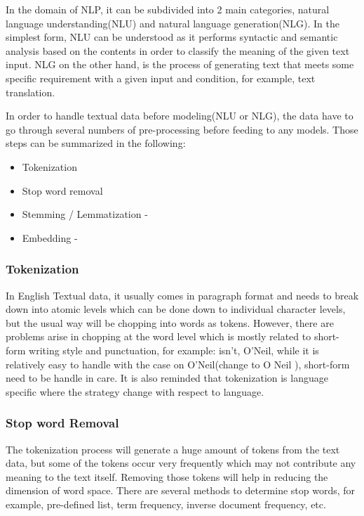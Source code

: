 \documentclass[12pt]{article}
\begin{document}
In the domain of NLP, it can be subdivided into 2 main categories, natural language understanding(NLU) and natural language generation(NLG). In the simplest form, NLU can be understood as it performs syntactic and semantic analysis based on the contents in order to classify the meaning of the given text input. NLG on the other hand, is the process of generating text that meets some specific requirement with a given input and condition, for example, text translation. 
 
In order to handle textual data before modeling(NLU or NLG), the data have to go through several numbers of pre-processing  before feeding to any models. Those steps can be summarized in the following\cite{Vijayarani_2015}:
        
        \begin{itemize}
            \item Tokenization
            \item Stop word removal 
            \item Stemming / Lemmatization - 
            \item Embedding - 
        \end{itemize}

\subsubsection{Tokenization}
In English Textual data, it usually comes in paragraph format and needs to break down into atomic levels which  can be done down to individual character levels, but the usual way will be chopping into words as tokens. However, there are problems arise in chopping at the word level which is mostly related to short-form writing style and punctuation, for example: isn't, O'Neil, while it is relatively easy to handle with the case on O'Neil(change to O Neil ), short-form need to be handle in care. It is also reminded that tokenization is language specific where the strategy change with respect to language.

\subsubsection{Stop word Removal}
The tokenization process will generate a huge amount of tokens from the text data, but some of the tokens occur very frequently which may not contribute any meaning to the text itself. Removing those tokens will help in reducing the dimension of word space. There are several methods to determine stop words, for example, pre-defined list, term frequency, inverse document frequency, etc.
\end{document}
